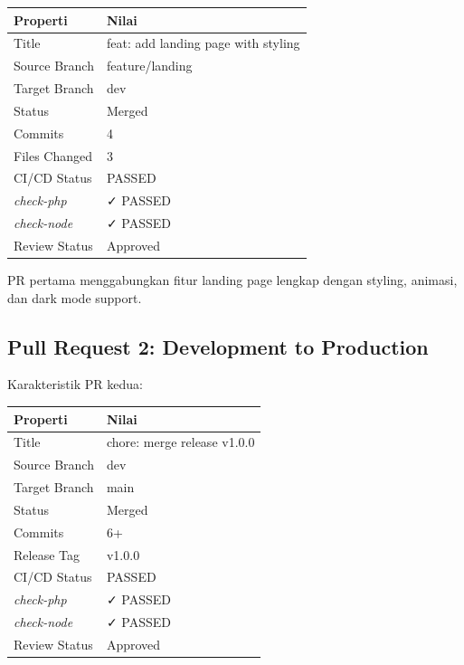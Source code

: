 \documentclass[a4paper,oneside,11pt]{book}
\begin{document}
\begin{center}
\begin{tabular}{|l|l|}
\hline
\textbf{Properti} & \textbf{Nilai} \\
\hline
Title & feat: add landing page with styling \\
\hline
Source Branch & feature/landing \\
\hline
Target Branch & dev \\
\hline
Status & Merged \\
\hline
Commits & 4 \\
\hline
Files Changed & 3 \\
\hline
CI/CD Status & PASSED \\
\hline
\textit{check-php} & ✓ PASSED \\
\hline
\textit{check-node} & ✓ PASSED \\
\hline
Review Status & Approved \\
\hline
\end{tabular}
\end{center}

PR pertama menggabungkan fitur landing page lengkap dengan styling, animasi, dan dark mode support.

\subsection{Pull Request 2: Development to Production}

Karakteristik PR kedua:

\begin{center}
\begin{tabular}{|l|l|}
\hline
\textbf{Properti} & \textbf{Nilai} \\
\hline
Title & chore: merge release v1.0.0 \\
\hline
Source Branch & dev \\
\hline
Target Branch & main \\
\hline
Status & Merged \\
\hline
Commits & 6+ \\
\hline
Release Tag & v1.0.0 \\
\hline
CI/CD Status & PASSED \\
\hline
\textit{check-php} & ✓ PASSED \\
\hline
\textit{check-node} & ✓ PASSED \\
\hline
Review Status & Approved \\
\hline
\end{tabular}
\end{center}
\end{document}
